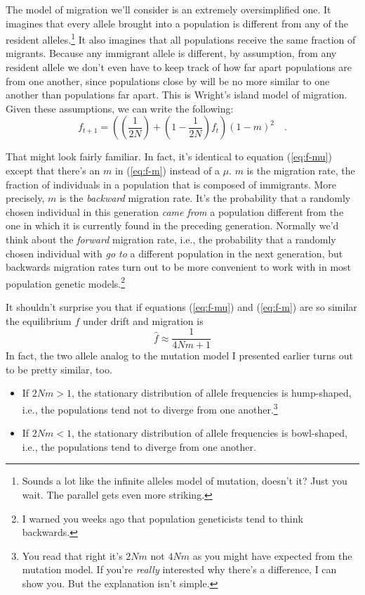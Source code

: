 \documentclass[12pt]{article}
\begin{document}
The model of migration we'll consider is an extremely oversimplified
one. It imagines that every allele brought into a population is
different from any of the resident alleles.\footnote{Sounds a lot like
  the infinite alleles model of mutation, doesn't it? Just you
  wait. The parallel gets even more striking.} It also imagines that
all populations receive the same fraction of migrants. Because any
immigrant allele is different, by assumption, from any resident allele
we don't even have to keep track of how far apart populations are from
one another, since populations close by will be no more similar to one
another than populations far apart. This is Wright's island model of
migration. Given these assumptions, we can write the following:
\begin{equation}
f_{t+1} = \left(\left(\frac{1}{2N}\right) +
          \left(1 - \frac{1}{2N}\right)f_t\right)(1-m)^2 \quad
\label{eq:f-m} .
\end{equation}

That might look fairly familiar. In fact, it's identical to equation
(\ref{eq:f-mu}) except that there's an $m$ in (\ref{eq:f-m}) instead
of a $\mu$. $m$ is the migration rate, the fraction of individuals in
a population that is composed of immigrants. More precisely, $m$ is
the {\it backward\/} migration rate.
It's the probability that a randomly chosen individual in this
generation {\it came from\/} a population different from the one in
which it is currently found in the preceding generation. Normally we'd
think about the {\it forward\/} migration rate,  i.e., the probability
that a randomly chosen individual with {\it go to\/} a different
population in the next generation, but backwards migration rates turn
out to be more convenient to work with in most population genetic
models.\footnote{I warned you weeks ago that population geneticists
  tend to think backwards.}

It shouldn't surprise you that if equations (\ref{eq:f-mu}) and
(\ref{eq:f-m}) are so similar the equilibrium $f$ under drift and
migration is
\[
\hat f \approx \frac{1}{4Nm + 1}
\]
In fact, the two allele analog to the mutation model I presented
earlier turns out to be pretty similar, too.

\begin{itemize}

\item If $2Nm > 1$, the stationary distribution of allele frequencies
is hump-shaped, i.e., the populations tend not to diverge from one
another.\footnote{You read that right it's $2Nm$ not $4Nm$ as you
might have expected from the mutation model. If you're {\it really\/}
interested why there's a difference, I can show you. But the
explanation isn't simple.}

\item If $2Nm < 1$, the stationary distribution of allele frequencies
is bowl-shaped, i.e., the populations tend to diverge from one another.

\end{itemize}
\end{document}

